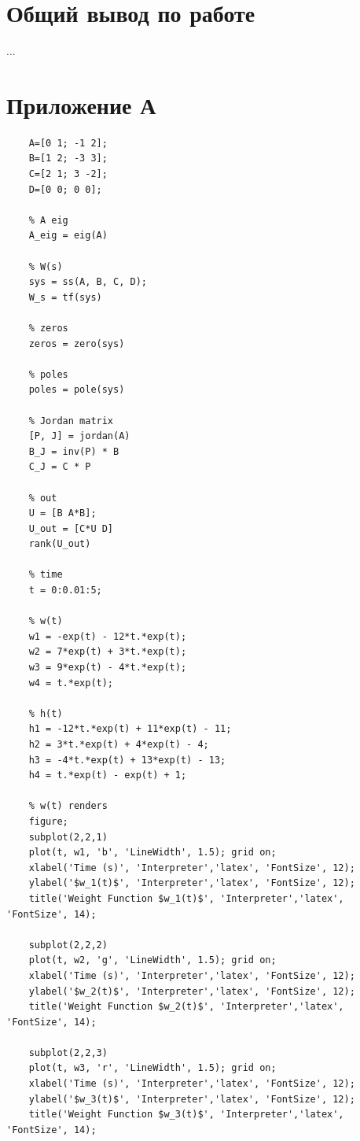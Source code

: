 \documentclass[a4paper, 12pt]{article}
\begin{document}
    \section{Общий вывод по работе}
    ...


    \section{Приложение А}
    \begin{lstlisting}[label=task1, caption={Программа для задания 1}]
    % plant parameters
    A=[0 1; -1 2];
    B=[1 2; -3 3];
    C=[2 1; 3 -2];
    D=[0 0; 0 0];

    % A eig
    A_eig = eig(A)

    % W(s)
    sys = ss(A, B, C, D);
    W_s = tf(sys)

    % zeros
    zeros = zero(sys)

    % poles
    poles = pole(sys)

    % Jordan matrix
    [P, J] = jordan(A)
    B_J = inv(P) * B
    C_J = C * P

    % out
    U = [B A*B];
    U_out = [C*U D]
    rank(U_out)

    % time
    t = 0:0.01:5;

    % w(t)
    w1 = -exp(t) - 12*t.*exp(t);
    w2 = 7*exp(t) + 3*t.*exp(t);
    w3 = 9*exp(t) - 4*t.*exp(t);
    w4 = t.*exp(t);

    % h(t)
    h1 = -12*t.*exp(t) + 11*exp(t) - 11;
    h2 = 3*t.*exp(t) + 4*exp(t) - 4;
    h3 = -4*t.*exp(t) + 13*exp(t) - 13;
    h4 = t.*exp(t) - exp(t) + 1;

    % w(t) renders
    figure;
    subplot(2,2,1)
    plot(t, w1, 'b', 'LineWidth', 1.5); grid on;
    xlabel('Time (s)', 'Interpreter','latex', 'FontSize', 12);
    ylabel('$w_1(t)$', 'Interpreter','latex', 'FontSize', 12);
    title('Weight Function $w_1(t)$', 'Interpreter','latex', 'FontSize', 14);

    subplot(2,2,2)
    plot(t, w2, 'g', 'LineWidth', 1.5); grid on;
    xlabel('Time (s)', 'Interpreter','latex', 'FontSize', 12);
    ylabel('$w_2(t)$', 'Interpreter','latex', 'FontSize', 12);
    title('Weight Function $w_2(t)$', 'Interpreter','latex', 'FontSize', 14);

    subplot(2,2,3)
    plot(t, w3, 'r', 'LineWidth', 1.5); grid on;
    xlabel('Time (s)', 'Interpreter','latex', 'FontSize', 12);
    ylabel('$w_3(t)$', 'Interpreter','latex', 'FontSize', 12);
    title('Weight Function $w_3(t)$', 'Interpreter','latex', 'FontSize', 14);


\end{lstlisting}
\end{document}
